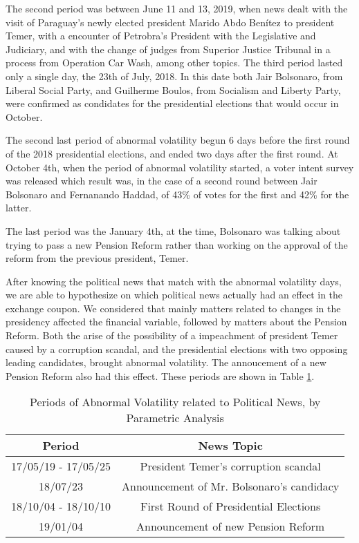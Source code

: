 \documentclass[cic,tc, english]{iiufrgs}
\begin{document}
    The second period was between June 11 and 13, 2019, when news dealt with the visit of Paraguay's newly elected president Marido Abdo Benítez to president Temer, with a encounter of Petrobra's President with the Legislative and Judiciary, and with the change of judges from Superior Justice Tribunal in a process from Operation Car Wash, among other topics. The third period lasted only a single day, the 23th of July, 2018. In this date both Jair Bolsonaro, from Liberal Social Party, and Guilherme Boulos, from Socialism and Liberty Party, were confirmed as condidates for the presidential elections that would occur in October.

    The second last period of abnormal volatility begun 6 days before the first round of the 2018 presidential elections, and ended two days after the first round. At October 4th, when the period of abnormal volatility started, a voter intent survey was released which result was, in the case of a second round between Jair Bolsonaro and Fernanando Haddad, of 43\% of votes for the first and 42\% for the latter.

    The last period was the January 4th, at the time, Bolsonaro was talking about trying to pass a new Pension Reform rather than working on the approval of the reform from the previous president, Temer.

    After knowing the political news that match with the abnormal volatility days, we are able to hypothesize on which political news actually had an effect in the exchange coupon. We considered that mainly matters related to changes in the presidency affected the financial variable, followed by matters about the Pension Reform. Both the arise of the possibility of a impeachment of president Temer caused by a corruption scandal, and the presidential elections with two opposing leading candidates, brought abnormal volatility. The annoucement of a new Pension Reform also had this effect. These periods are shown in Table \ref{tab:respar}.

    \begin{table}[H]
        \caption{Periods of Abnormal Volatility related to Political News, by Parametric Analysis}
        \label{tab:respar}
        \centering
        \begin{tabular}{| c | c |}
            \hline
            Period & News Topic \\
            \hline \hline
            17/05/19 - 17/05/25 & President Temer's corruption scandal \\
            \hline
            18/07/23 & Announcement of Mr. Bolsonaro's candidacy \\
            \hline
            18/10/04 - 18/10/10 & First Round of Presidential Elections \\
            \hline
            19/01/04 & Announcement of new Pension Reform \\
            \hline
        \end{tabular}
    \end{table}
\end{document}
